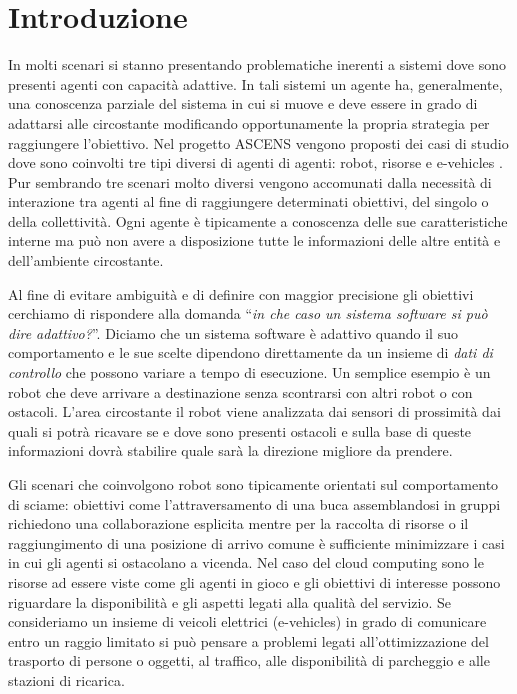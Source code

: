 

\chapter{Introduzione}

In molti scenari si stanno presentando problematiche inerenti a sistemi dove sono presenti agenti con capacità adattive. In tali sistemi un agente ha, generalmente, una conoscenza parziale del sistema in cui si muove e deve essere in grado di adattarsi alle circostante modificando opportunamente la propria strategia per raggiungere l'obiettivo. Nel progetto ASCENS vengono proposti dei casi di studio dove sono coinvolti tre tipi diversi di agenti di agenti: robot, risorse e e-vehicles \cite{ascens-wp71}. Pur sembrando tre scenari molto diversi vengono accomunati dalla necessità di interazione tra agenti al fine di raggiungere determinati obiettivi, del singolo o della collettività. Ogni agente è tipicamente a conoscenza delle sue caratteristiche interne ma può non avere a disposizione tutte le informazioni delle altre entità e dell'ambiente circostante.

Al fine di evitare ambiguità e di definire con maggior precisione gli obiettivi cerchiamo di rispondere alla domanda ``\emph{in che caso un sistema software si può dire adattivo?}''\cite{concfwada}. 
Diciamo che un sistema software è adattivo quando il suo comportamento e le sue scelte dipendono direttamente da un insieme di \emph{dati di controllo} che possono variare a tempo di esecuzione. Un semplice esempio è un robot che deve arrivare a destinazione senza scontrarsi con altri robot o con ostacoli. L'area circostante il robot viene analizzata dai sensori di prossimità dai quali si potrà ricavare se e dove sono presenti ostacoli e sulla base di queste informazioni dovrà stabilire quale sarà la direzione migliore da prendere.

Gli scenari che coinvolgono robot sono tipicamente orientati sul comportamento di sciame: obiettivi come l'attraversamento di una buca \cite{adapselfassmaude}
assemblandosi in gruppi richiedono una collaborazione esplicita mentre per la raccolta di risorse \cite{foragingscenarioklaim} o il raggiungimento di una posizione di arrivo comune è sufficiente minimizzare i casi in cui gli agenti si ostacolano a vicenda. Nel caso del cloud computing sono le risorse ad essere viste come gli agenti in gioco e gli obiettivi di interesse possono riguardare la disponibilità e gli aspetti legati alla qualità del servizio. Se consideriamo un insieme di veicoli elettrici (e-vehicles) in grado di comunicare entro un raggio limitato si può pensare a problemi legati all'ottimizzazione del trasporto di persone o oggetti, al traffico, alle disponibilità di parcheggio e alle stazioni di ricarica.


